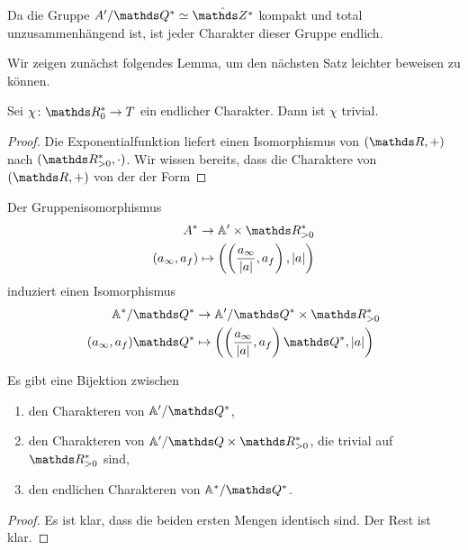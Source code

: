 Da die Gruppe $A'/\Q^\ast\simeq \hat{\Z^\ast}$ kompakt und total unzusammenhängend ist, ist jeder Charakter dieser Gruppe endlich.

Wir zeigen zunächst folgendes Lemma, um den nächsten Satz leichter beweisen zu können.
\begin{lem}
Sei $\chi \colon \R_0^\ast \to T$ ein endlicher Charakter.
Dann ist $\chi$ trivial.
\end{lem}
\begin{proof}
Die Exponentialfunktion liefert einen Isomorphismus von $(\R,+)$ nach $(\R_{>0}^\ast,\cdot)$.
Wir wissen bereits, dass die Charaktere von $(\R,+)$ von der der Form
\end{proof}

Der Gruppenisomorphismus
\begin{align*}
A^\ast &\to \A' \times \R_{>0}^\ast\\
(a_\infty,a_f)&\mapsto \left( \left( \frac{a_\infty}{\abs{a}},a_f\right),\abs{a}\right)
\end{align*}
induziert einen Isomorphismus
\begin{align*}
\A^\ast/\Q^\ast &\to \A'/\Q^\ast \times \R_{>0}^\ast\\
(a_\infty,a_f)\Q^\ast&\mapsto \left( \left( \frac{a_\infty}{\abs{a}},a_f\right)\Q^\ast,\abs{a}\right)
\end{align*}

\begin{prop}
Es gibt eine Bijektion zwischen
\begin{enumerate}[label=\roman*)]
\item den Charakteren von $\A'/\Q^\ast$,
\item den Charakteren von $\A'/\Q \times \R_{>0}^\ast$, die trivial auf $\R_{>0}^\ast$ sind,
\item den endlichen Charakteren von $\A^\ast/\Q^\ast$.
\end{enumerate}
\end{prop}
\begin{proof}
Es ist klar, dass die beiden ersten Mengen identisch sind.
Der Rest ist klar.
\end{proof}


